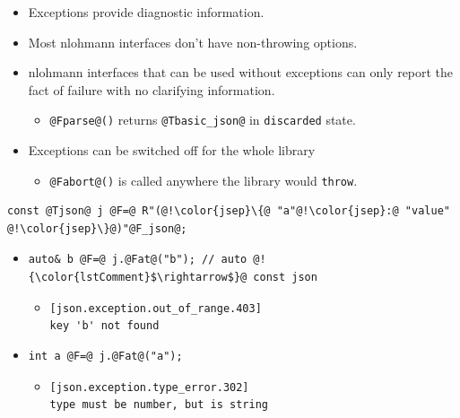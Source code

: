\documentclass{slides}
\makeatletter
\newcommand{\@slidetitle}{}
\newcommand{\slidetitle}[1]{\renewcommand{\@slidetitle}{#1}}
\makeatother
\begin{document}
\begin{itemize}
  \item Exceptions provide diagnostic information.
  \item Most {\ttfamily nlohmann} interfaces don't have non-throwing options.
  \item {\ttfamily nlohmann} interfaces that can be used without exceptions
    can only report the fact of failure with no clarifying information.
    \begin{itemize}
      \item \lstinline{@Fparse@()} returns \lstinline{@Tbasic_json@} in
        \lstinline{discarded} state.
    \end{itemize}
  \item Exceptions can be switched off for the whole library \hfill
    \href{https://json.nlohmann.me/home/exceptions/#switch-off-exceptions}{\faFileTextO}
    \begin{itemize}
      \item \lstinline{@Fabort@()} is called anywhere the library would
        \lstinline{throw}.
    \end{itemize}
\end{itemize}

\pagebreak
\slidetitle{Exceptions examples}

\begin{lstlisting}
const @Tjson@ j @F=@ R"(@!\color{jsep}\{@ "a"@!\color{jsep}:@ "value" @!\color{jsep}\}@)"@F_json@;
\end{lstlisting}

\begin{itemize}
  \item \begin{lstlisting}
auto& b @F=@ j.@Fat@("b"); // auto @!{\color{lstComment}$\rightarrow$}@ const json
    \end{lstlisting}
    \begin{itemize}
      \item \color{red}\verb|[json.exception.out_of_range.403]| \\
        \verb|key 'b' not found|
    \end{itemize}

  \item \begin{lstlisting}
int a @F=@ j.@Fat@("a");
    \end{lstlisting}
    \begin{itemize}
      \item \color{red}\verb|[json.exception.type_error.302]| \\
        \verb|type must be number, but is string|
    \end{itemize}
\end{itemize}
\end{document}
